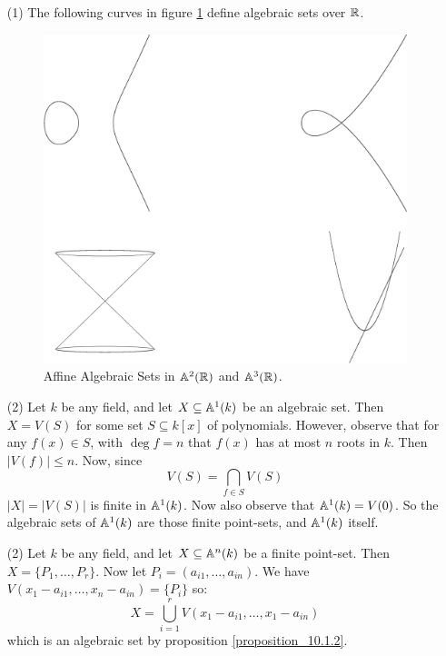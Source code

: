 \begin{example}\label{example_10.1}
  \begin{enumerate}
    \item[(1)] The following curves in figure \ref{figure_1.1} define
      algebraic sets over $\mathbb{R}$.
      \begin{figure}[h]
        \centering
        \includegraphics[scale=0.5]{parts/algebraic_curves/figures/Chapter1/hyperplanes.eps}
        \caption{Affine Algebraic Sets in $\mathbb{A}^2(\mathbb{R})$ and $\mathbb{A}^3(\mathbb{R})$.}
        \label{figure_1.1}
      \end{figure}

    \item[(2)] Let $k$ be any field, and let $X \subseteq \mathbb{A}^1(k)$ be
      an algebraic set. Then $X=V(S)$ for some set $S \subseteq k[x]$
      of polynomials. However, observe that for any $f(x) \in S$, with
      $\deg{f}=n$ that $f(x)$ has at most $n$ roots in $k$. Then
      $|V(f)| \leq n$. Now, since
      \begin{equation*}
        V(S) = \bigcap_{f \in S}{V(S)}
      \end{equation*}
      $|X|=|V(S)|$ is finite in $\mathbb{A}^1(k)$. Now also observe that
      $\mathbb{A}^1(k)=V(0)$. So the algebraic sets of $\mathbb{A}^1(k)$ are those
      finite point-sets, and $\mathbb{A}^1(k)$ itself.

    \item[(2)] Let $k$ be any field, and let $X \subseteq \mathbb{A}^n(k)$ be
      a finite point-set. Then $X=\{P_1, \dots, P_r\}$. Now let
      $P_i=(a_{i1}, \dots, a_{in})$. We have $V(x_1-a_{i1}, \dots,
      x_n-a_{in})=\{P_i\}$ so:
      \begin{equation*}
        X=\bigcup_{i=1}^r{V(x_1-a_{i1}, \dots, x_1-a_{in})}
      \end{equation*}
      which is an algebraic set by proposition
      \ref{proposition_10.1.2}.


\end{enumerate}
\end{example}
